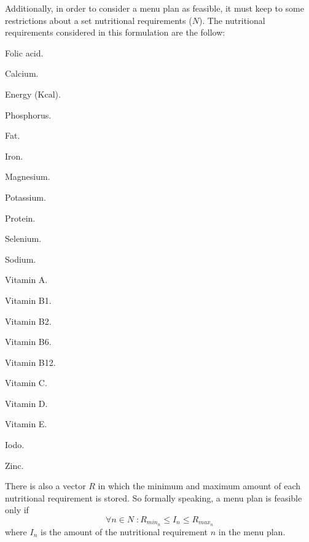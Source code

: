 Additionally, in order to consider a menu plan as feasible, it must keep to some restrictions about a set nutritional requirements ($N$). The nutritional requirements considered in this formulation are the follow:
\begin{AutoMultiColItemize}
    \item Folic acid.
    \item Calcium.
    \item Energy (Kcal).
    \item Phosphorus.
    \item Fat.
    \item Iron.
    \item Magnesium.
    \item Potassium.
    \item Protein.
    \item Selenium.
    \item Sodium.
    \item Vitamin A.
    \item Vitamin B1.
    \item Vitamin B2.
    \item Vitamin B6.
    \item Vitamin B12.
    \item Vitamin C.
    \item Vitamin D.
    \item Vitamin E.
    \item Iodo.
    \item Zinc.
\end{AutoMultiColItemize}
There is also a vector $R$ in which the minimum and maximum amount of each nutritional requirement is stored. So formally speaking, a menu plan is feasible only if
\[
    \forall	 n \in N\; : R_{min_{n}} \leq I_{n} \leq R_{max_{n}}
\]
where $I_{n}$ is the amount of the nutritional requirement $n$ in the menu plan.